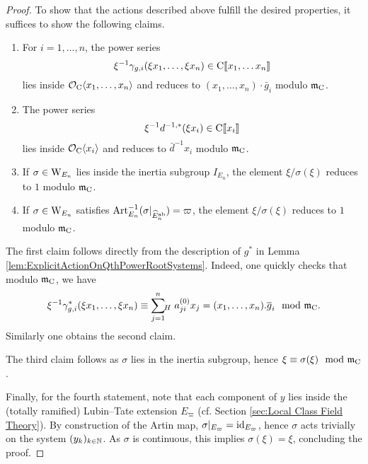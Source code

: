 \documentclass[../main.tex]{subfiles}
\begin{document}
\begin{proof}
To show that the actions described above fulfill the desired properties, it suffices
to show the following claims.
\begin{enumerate}
  \item For $i = 1, \dots, n$, the power series 
    $$\xi^{-1}\gamma_{g,i}(\xi x_1, \dots, \xi x_n) \in {\mathrm{C}}\llbracket x_1, \dots x_n \rrbracket$$
    lies inside $\mathcal{O}_{\mathrm{C}} \langle x_1, \dots, x_n \rangle$ and reduces to $(x_1,
    \dots, x_n)\cdot \bar g_i$ modulo $\mathfrak{m}_{\mathrm{C}}$.
  \item The power series 
    \begin{equation*}
      \xi^{-1} d^{-1, *} (\xi x_i) \in {\mathrm{C}} \llbracket x_i\rrbracket 
    \end{equation*}
    lies inside $\mathcal{O}_{\mathrm{C}} \langle x_i \rangle$ and reduces to $\bar d^{-1} x_i$
    modulo $\mathfrak{m}_{\mathrm{C}}$. 
  \item If $\sigma \in \mathrm W_{E_n}$ lies inside the inertia subgroup $I_{E_n}$,
    the element
    $\xi/\sigma(\xi)$ reduces to $1$ modulo $\mathfrak{m}_{\mathrm{C}}$.
  \item If $\sigma \in \mathrm W_{E_n}$ satisfies $\mathrm{Art}^{-1}_{E_n}(\sigma|_{\widehat
    E_n^{\mathrm{ab}}}) = \varpi$, the element
    $\xi/\sigma(\xi)$ reduces to $1$ modulo $\mathfrak{m}_{\mathrm{C}}$. 
\end{enumerate}
The first claim follows directly from the description of $g^*$ in
Lemma \ref{lem:ExplicitActionOnQthPowerRootSystems}. Indeed, one quickly checks
that modulo $\mathfrak{m}_{\mathrm{C}}$, we have 
$$\xi^{-1} \gamma_{g,i}^*(\xi x_1, \dots, \xi x_n) \equiv \sum_{j=1}^n {\hspace{-3pt}}_H\hspace{3pt}
a_{ji}^{(0)} x_j = (x_1, \dots, x_n).\overline g_i \mod {\mathfrak{m}}_{\mathrm{C}}.$$ 
Similarly one obtains the second claim.

The third claim follows as $\sigma$ lies in the inertia subgroup,
hence $\xi \equiv \sigma(\xi) \mod {\mathfrak{m}}_{\mathrm{C}}$.

Finally, for the fourth statement, note that each component of $y$ lies inside the
(totally ramified) Lubin--Tate extension $E_\varpi$ (cf. Section \ref{sec:Local
Class Field Theory}). By construction of the Artin map, $\sigma|_{E_\varpi} = 
\operatorname{id}_{E_\varpi}$, hence $\sigma$ acts trivially on the system
$(y_k)_{k\in \mathbb{N}}$. As $\sigma$ is continuous, this implies $\sigma(\xi) = \xi$,
concluding the proof.
\end{proof}
\end{document}
